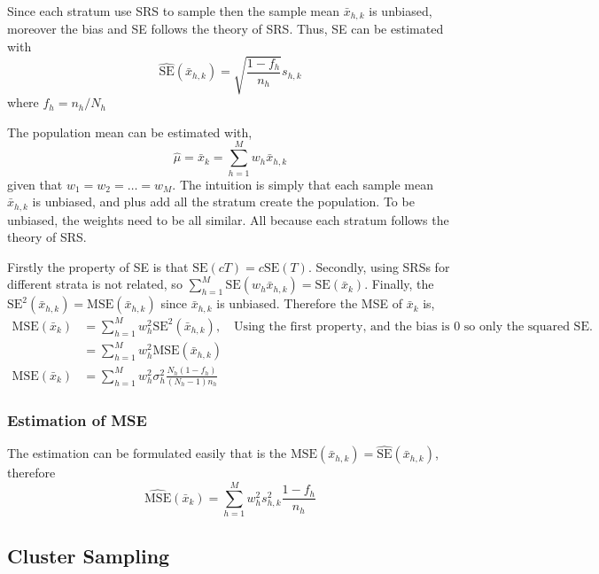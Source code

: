 Since each stratum use SRS to sample then the sample mean $\bar{x}_{h,k}$ is unbiased, moreover the bias and SE follows the theory of SRS. Thus, SE can be estimated with
\begin{equation}
    \hat{\mathrm{SE}}(\bar{x}_{h,k})=\sqrt{\frac{1-f_h}{n_h}}s_{h,k}
\end{equation}
where $f_h=n_h/N_h$

The population mean can be estimated with,
\begin{equation}
    \hat{\mu}=\bar{x}_{k}=\sum_{h=1}^{M}w_h\bar{x}_{h,k}
\end{equation}
given that $w_1=w_2=\ldots=w_M$. The intuition is simply that each sample mean $\bar{x}_{h,k}$ is unbiased, and plus add all the stratum create the population. To be unbiased, the weights need to be all similar. All because each stratum follows 
the theory of SRS.

Firstly the property of SE is that $\mathrm{SE}(cT)=c\mathrm{SE}(T)$. Secondly, using SRSs for different strata is not related, so $\sum^M_{h=1}\mathrm{SE}(w_h\bar{x}_{h,k})=\mathrm{SE}(\bar{x}_k)$. Finally, the 
$\mathrm{SE}^2(\bar{x}_{h,k})=\mathrm{MSE}(\bar{x}_{h,k})$ since $\bar{x}_{h,k}$ is unbiased. Therefore the MSE of $\bar{x}_k$ is,
\begin{equation}
    \begin{aligned}
        \mathrm{MSE}(\bar{x}_k)&=\sum_{h=1}^{M}w^2_h\mathrm{SE}^2(\bar{x}_{h,k}),\quad\text{Using the first property, and the bias is 0 so only the squared SE.}\\
        &=\sum_{h=1}^{M}w^2_h\mathrm{MSE}(\bar{x}_{h,k})\\
        \mathrm{MSE}(\bar{x}_k)&=\sum_{h=1}^{M}w^2_h\sigma^2_h\frac{N_h(1-f_h)}{(N_h-1)n_h}
    \end{aligned}
\end{equation}
\subsubsection{Estimation of MSE}
The estimation can be formulated easily that is the $\mathrm{MSE}(\bar{x}_{h,k})=\hat{\mathrm{SE}}(\bar{x}_{h,k})$, therefore
\begin{equation}
    \hat{\mathrm{MSE}}(\bar{x}_k)=\sum_{h=1}^{M}w^2_hs^2_{h,k}\frac{1-f_h}{n_h}
\end{equation}

\subsection{Cluster Sampling}
